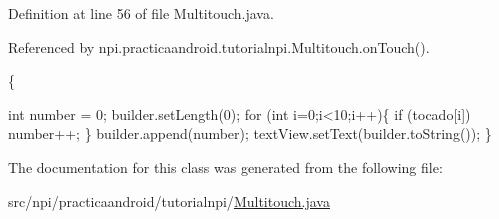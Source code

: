 Definition at line 56 of file Multitouch.\-java.



Referenced by npi.\-practicaandroid.\-tutorialnpi.\-Multitouch.\-on\-Touch().


\begin{DoxyCode}
                                 \{
        
        \textcolor{keywordtype}{int} number = 0;
        builder.setLength(0);
        \textcolor{keywordflow}{for} (\textcolor{keywordtype}{int} i=0;i<10;i++)\{
            \textcolor{keywordflow}{if} (tocado[i])
                number++;
        \}
        builder.append(number);
        textView.setText(builder.toString());
    \}
\end{DoxyCode}


The documentation for this class was generated from the following file\-:\begin{DoxyCompactItemize}
\item 
src/npi/practicaandroid/tutorialnpi/\hyperlink{_multitouch_8java}{Multitouch.\-java}\end{DoxyCompactItemize}
